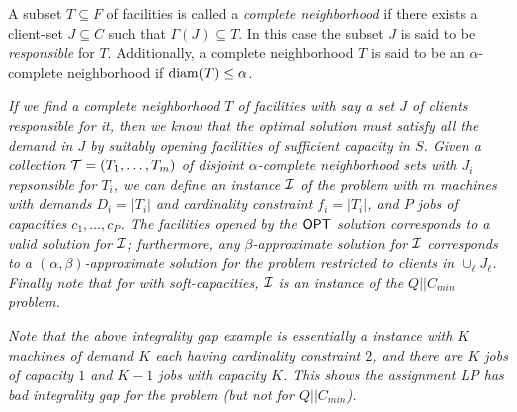 \begin{definition} \label{def:comp-nbr}
	A subset $T\subseteq F$ of facilities is called a {\em complete neighborhood} if there exists a client-set $J\subseteq C$ such that $\Gamma(J) \subseteq T$.
	In this case the subset $J$ is said to be {\em responsible} for $T$. Additionally, a complete neighborhood $T$ is said to be an $\alpha$-complete neighborhood if $\mathrm{diam}(T) \leq \alpha$.
\end{definition}
\begin{remark}\label{rem:red}
	\emph{
If we find a complete neighborhood $T$ of facilities with say a set $J$ of clients responsible for it, then we know that the optimal solution must satisfy all the demand in $J$ by suitably opening facilities of sufficient capacity in $S$. Given a collection ${\cal T} = (T_1,\ldots,T_m)$ of disjoint $\alpha$-complete neighborhood sets with $J_i$ repsonsible for $T_i$, we can define an instance ${\cal I}$ of the \cckp problem with $m$ machines with demands $D_i = |T_i|$ and cardinality constraint $f_i = |T_i|$, and $P$ jobs of capacities $c_1,\ldots,c_P$. The facilities opened by the $\mathsf{OPT} $ solution corresponds to a valid solution for ${\cal I}$; furthermore, any $\beta$-approximate solution for ${\cal I}$ corresponds to a $(\alpha,\beta)$-approximate solution for the \mckc problem restricted to clients in $\cup_{\ell} J_\ell$. Finally note that for \mckc with soft-capacities, ${\cal I}$ is an instance of the $Q||C_{min}$ problem.
}

\emph{
Note that the above integrality gap  example is essentially a \cckp instance with $K$ machines of demand $K$ each having cardinality constraint $2$, and there are $K$ jobs of capacity $1$ and $K-1$ jobs with capacity $K$. This shows the assignment LP has bad integrality gap for the \cckp problem (but not for $Q||C_{min}$).}
\end{remark}

